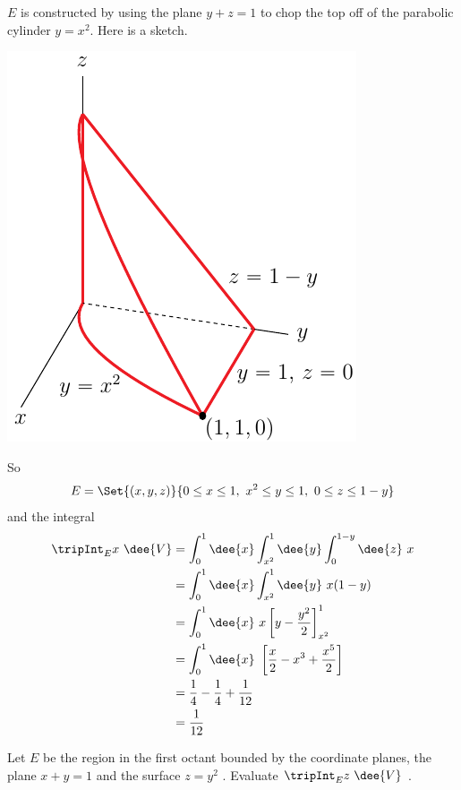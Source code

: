 \begin{solution}
\begin{center}
\end{center}
$E$ is constructed by using the plane $y+z=1$ to chop the top
off of the parabolic cylinder $y=x^2$. Here is a sketch.
\begin{center}
     \includegraphics{fig/OE11D_7c.pdf}
\end{center}
So
\begin{equation*}
E=\Set{(x,y,z)}{0\le x\le 1,\ x^2\le y\le 1,\ 0\le z\le 1-y}
\end{equation*}
and the integral
\begin{align*}
\tripInt_E x\ \dee{V}
&=\int_0^1\dee{x}\int_{x^2}^1\dee{y}\int_0^{1-y}\dee{z}\ x \\
&=\int_0^1\dee{x}\int_{x^2}^1\dee{y}\ x(1-y) \\
&=\int_0^1\dee{x}\ x\left[y-\frac{y^2}{2}\right]_{x^2}^1 \\
&=\int_0^1\dee{x}\ \left[\frac{x}{2} -x^3+\frac{x^5}{2}\right] \\
&=\frac{1}{4}-\frac{1}{4}+\frac{1}{12} \\
&=\frac{1}{12}
\end{align*} 
\end{solution}

\begin{question}[M200 2012A] %
Let $E$ be the region in the first octant bounded by the coordinate planes, 
the plane $x + y = 1$ and the surface $z = y^2$ .  Evaluate
$\tripInt_E z\ \dee{V}$ .
\end{question}

